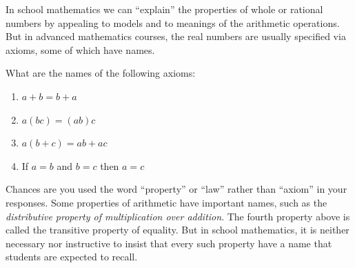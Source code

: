 
\begin{question}
In school mathematics we can ``explain'' the properties of whole or rational numbers by appealing to models and to meanings of the arithmetic operations.  But in advanced mathematics courses, the real numbers are usually specified via axioms, some of which have names.  

What are the names of the following axioms:  
\begin{enumerate}
\item $a + b = b + a$  
\item $a(bc) = (ab)c$
\item $a(b+c) = ab + ac$
\item If $a = b$ and $b = c$ then $a = c$ 
\end{enumerate}
\end{question}
\QM

Chances are you used the word ``property'' or ``law'' rather than ``axiom'' in your responses.  Some properties of arithmetic have important names, such as the \emph{distributive property of multiplication over addition}.  The fourth property above is called the transitive property of equality.  But in school mathematics, it is neither necessary nor instructive to insist that every such property have a name that students are expected to recall.  


%



